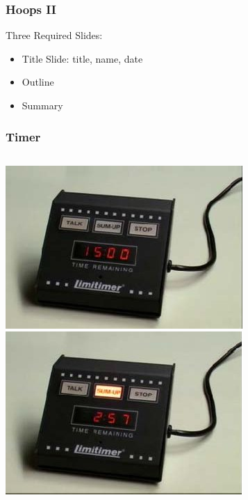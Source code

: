 \documentclass{beamer}
\begin{document}
\begin{frame}

\frametitle{Hoops II}
\Large

Three Required Slides:
\begin{itemize}
\item Title Slide: title, name, date
\item Outline
\item Summary
\end{itemize}

\end{frame}

\begin{frame}
\frametitle{Timer}

\begin{columns}[c]
\includegraphics[width=.9\columnwidth]{before}\\
\includegraphics[width=.9\columnwidth]{wrapup}

\end{columns}
\end{frame}
\end{document}

